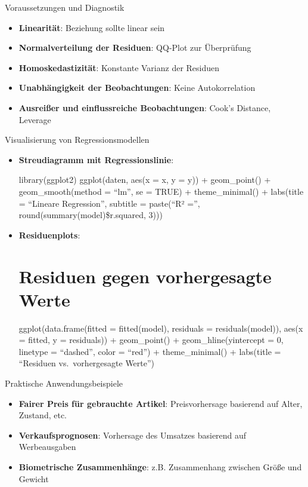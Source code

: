 \documentclass[
  ignorenonframetext,
]{beamer}
\providecommand{\tightlist}{%
  \setlength{\itemsep}{0pt}\setlength{\parskip}{0pt}}
\begin{document}
\begin{frame}{Voraussetzungen und Diagnostik}
\protect{}\label{voraussetzungen-und-diagnostik}
\begin{itemize}
\tightlist
\item
  \textbf{Linearität}: Beziehung sollte linear sein
\item
  \textbf{Normalverteilung der Residuen}: QQ-Plot zur Überprüfung
\item
  \textbf{Homoskedastizität}: Konstante Varianz der Residuen
\item
  \textbf{Unabhängigkeit der Beobachtungen}: Keine Autokorrelation
\item
  \textbf{Ausreißer und einflussreiche Beobachtungen}: Cook's Distance,
  Leverage
\end{itemize}
\end{frame}

\begin{frame}{Visualisierung von Regressionsmodellen}
\protect{}\label{visualisierung-von-regressionsmodellen}
\begin{itemize}
\item
  \textbf{Streudiagramm mit Regressionslinie}:

  library(ggplot2) ggplot(daten, aes(x = x, y = y)) + geom\_point() +
  geom\_smooth(method = ``lm'', se = TRUE) + theme\_minimal() +
  labs(title = ``Lineare Regression'', subtitle = paste(``R² ='',
  round(summary(model)\$r.squared, 3)))
\item
  \textbf{Residuenplots}:

  \section{Residuen gegen vorhergesagte
  Werte}\label{residuen-gegen-vorhergesagte-werte}

  ggplot(data.frame(fitted = fitted(model), residuals =
  residuals(model)), aes(x = fitted, y = residuals)) + geom\_point() +
  geom\_hline(yintercept = 0, linetype = ``dashed'', color = ``red'') +
  theme\_minimal() + labs(title = ``Residuen vs.~vorhergesagte Werte'')
\end{itemize}
\end{frame}

\begin{frame}{Praktische Anwendungsbeispiele}
\protect{}\label{praktische-anwendungsbeispiele-3}
\begin{itemize}
\tightlist
\item
  \textbf{Fairer Preis für gebrauchte Artikel}: Preisvorhersage
  basierend auf Alter, Zustand, etc.
\item
  \textbf{Verkaufsprognosen}: Vorhersage des Umsatzes basierend auf
  Werbeausgaben
\item
  \textbf{Biometrische Zusammenhänge}: z.B. Zusammenhang zwischen Größe
  und Gewicht
\end{itemize}
\end{frame}
\end{document}
